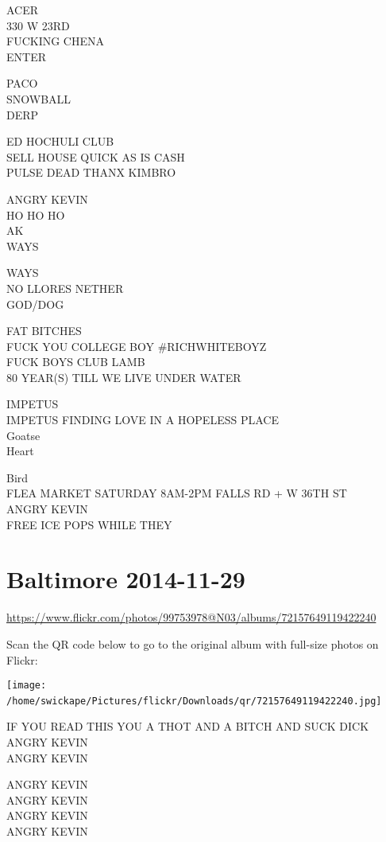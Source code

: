 \documentclass[10pt,letterpaper]{article}
\begin{document}
ACER\\
330 W 23RD\\
FUCKING CHENA\\
ENTER

PACO\\
SNOWBALL\\
DERP

ED HOCHULI CLUB\\
SELL HOUSE QUICK AS IS CASH\\
PULSE DEAD THANX KIMBRO

ANGRY KEVIN\\
HO HO HO\\
AK\\
WAYS

WAYS\\
NO LLORES NETHER\\
GOD/DOG

FAT BITCHES\\
FUCK YOU COLLEGE BOY \#RICHWHITEBOYZ\\
FUCK BOYS CLUB LAMB\\
80 YEAR(S) TILL WE LIVE UNDER WATER

IMPETUS\\
IMPETUS FINDING LOVE IN A HOPELESS PLACE\\
Goatse\\
Heart

Bird\\
FLEA MARKET SATURDAY 8AM{-}2PM FALLS RD + W 36TH ST\\
ANGRY KEVIN\\
FREE ICE POPS WHILE THEY
\

\section*{Baltimore 2014-11-29}

\url{https://www.flickr.com/photos/99753978@N03/albums/72157649119422240}

Scan the QR code below to go to the original album with full-size photos on Flickr:

\texttt{[image: /home/swickape/Pictures/flickr/Downloads/qr/72157649119422240.jpg]}
\

IF YOU READ THIS YOU A THOT AND A BITCH AND SUCK DICK\\
ANGRY KEVIN\\
ANGRY KEVIN

ANGRY KEVIN\\
ANGRY KEVIN\\
ANGRY KEVIN\\
ANGRY KEVIN
\end{document}
